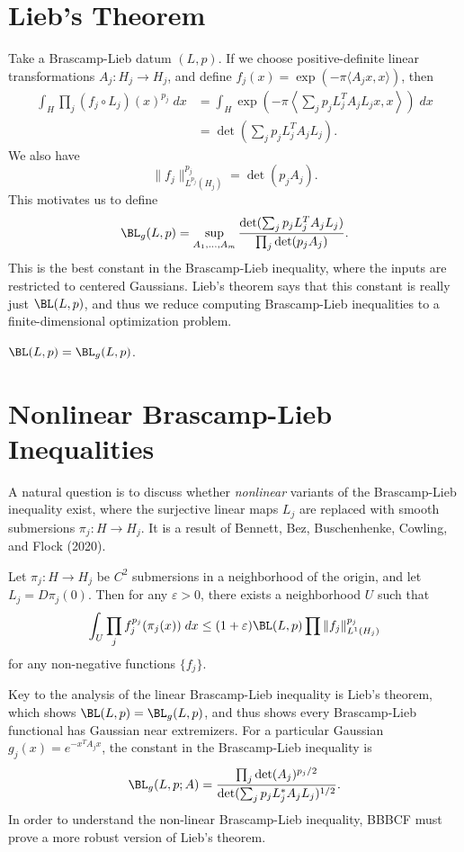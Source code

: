 \section{Lieb's Theorem}

Take a Brascamp-Lieb datum $(L,p)$. If we choose positive-definite linear transformations $A_j: H_j \to H_j$, and define $f_j(x) = \exp(- \pi \langle A_j x, x \rangle)$, then
%
\begin{align*}
    \int_H \prod_j (f_j \circ L_j)(x)^{p_j}\; dx &= \int_H \exp \left( - \pi \left\langle \sum_j p_j L_j^T A_j L_j x, x \right\rangle \right)\; dx\\
    &= \det \left( \sum_j p_j L_j^T A_j L_j \right).
\end{align*}
%
We also have
%
\[ \| f_j \|_{L^{p_j}(H_j)}^{p_j} = \det(p_j A_j). \]
%
This motivates us to define
%
\[ \BL_g(L,p) = \sup_{A_1,\dots,A_m} \frac{\det( \sum_j p_j L_j^T A_j L_j)}{\prod_j \det(p_j A_j)}. \]
%
This is the best constant in the Brascamp-Lieb inequality, where the inputs are restricted to centered Gaussians. Lieb's theorem says that this constant is really just $\BL(L,p)$, and thus we reduce computing Brascamp-Lieb inequalities to a finite-dimensional optimization problem.

\begin{theorem}[Lieb]
    $\BL(L,p) = \BL_g(L,p)$.
\end{theorem}




\section{Nonlinear Brascamp-Lieb Inequalities}

A natural question is to discuss whether \emph{nonlinear} variants of the Brascamp-Lieb inequality exist, where the surjective linear maps $L_j$ are replaced with smooth submersions $\pi_j: H \to H_j$. It is a result of Bennett, Bez, Buschenhenke, Cowling, and Flock (2020).

\begin{theorem}
    Let $\pi_j: H \to H_j$ be $C^2$ submersions in a neighborhood of the origin, and let $L_j = D \pi_j(0)$. Then for any $\varepsilon > 0$, there exists a neighborhood $U$ such that
    \[ \int_U \prod_j f_j^{p_j}(\pi_j(x))\; dx \leq (1 + \varepsilon) \BL(L,p) \prod \| f_j \|_{L^1(H_j)}^{p_j} \]
    for any non-negative functions $\{ f_j \}$.
\end{theorem}

Key to the analysis of the linear Brascamp-Lieb inequality is Lieb's theorem, which shows $\BL(L,p) = \BL_g(L,p)$, and thus shows every Brascamp-Lieb functional has Gaussian near extremizers. For a particular Gaussian $g_j(x) = e^{- x^T A_j x}$, the constant in the Brascamp-Lieb inequality is
%
\[ \BL_g(L,p;A) = \frac{\prod_j \det(A_j)^{p_j/2}}{\det( \sum_j p_j L_j^* A_j L_j )^{1/2}}. \]
%
In order to understand the non-linear Brascamp-Lieb inequality, BBBCF must prove a more robust version of Lieb's theorem.

